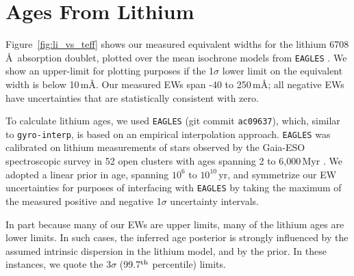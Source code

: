 \documentclass[11pt,twocolumn,tighten]{aastex63}
\begin{document}
\section{Ages From Lithium}
\label{sec:liage} 

Figure~\ref{fig:li_vs_teff} shows our measured equivalent widths for
the lithium 6708\,\AA\ absorption doublet, plotted over the mean
isochrone models from \texttt{EAGLES} \citep{Jeffries_2023}.  We
show an upper-limit for plotting purposes if the 1$\sigma$ lower
limit on the equivalent width is below 10\,m\AA.  Our measured EWs
span -40 to 250\,m\AA; all negative EWs have uncertainties that are
statistically consistent with zero.

To calculate lithium ages, we used \texttt{EAGLES} (git commit
\texttt{ac09637}), which, similar to \texttt{gyro-interp}, is based on
an empirical interpolation approach.  \texttt{EAGLES} 
was calibrated on lithium measurements of stars observed by the
Gaia-ESO spectroscopic survey in 52 open clusters with ages spanning 2
to 6{,}000\,Myr \citep{Jeffries_2023}.  We adopted a linear prior in
age, spanning $10^6$ to $10^{10}$\,yr, and symmetrize our EW
uncertainties for purposes of interfacing with \texttt{EAGLES} by
taking the maximum of the measured positive and negative 1$\sigma$
uncertainty intervals.

In part because many of our EWs are upper limits, many of the lithium
ages are lower limits.  In such cases,  the inferred age posterior is
strongly influenced by the assumed intrinsic dispersion in
the lithium model, and by the prior.  In these instances, we
quote the 3$\sigma$ (99.7$^{\rm th}$ percentile) limits.
\end{document}
